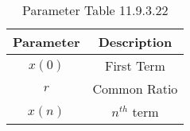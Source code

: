 
\begin{table}[ht]
  \centering
  \begin{tabular}{|c||c|}
    \hline
    Parameter & Description  \\
    \hline
     $x(0)$ & First Term \\
     \hline
     $r$ & Common Ratio \\
    \hline
    $x(n)$ & $n^{th}$ term\\
    \hline
  \end{tabular}
  \vspace{2mm}
  \caption{Parameter Table 11.9.3.22}
\end{table}
